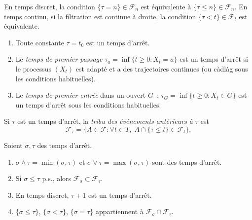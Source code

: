 \begin{remarque}
En temps discret, la condition $\{\tau = n\} \in \mathcal{F}_n$ est \'equivalente
\`a $\{\tau \leq n\} \in \mathcal{F}_n$. En temps continu, si la filtration est
continue \`a droite, la condition $\{\tau < t\} \in \mathcal{F}_t$ est \'equivalente.
\end{remarque}

\begin{exemple}
\begin{enumerate}
  \item Toute constante $\tau = t_0$ est un temps d'arr\^et.
  \item Le \emph{temps de premier passage} $\tau_a = \inf\{t \geq 0 : X_t = a\}$
    est un temps d'arr\^et si le processus $(X_t)$ est adapt\'e et a des trajectoires
    continues (ou c\`adl\`ag sous les conditions habituelles).
  \item Le \emph{temps de premier entr\'ee} dans un ouvert $G$~:
    $\tau_G = \inf\{t \geq 0 : X_t \in G\}$ est un temps d'arr\^et sous les
    conditions habituelles.
\end{enumerate}
\end{exemple}

\begin{definition}
\label{def:tribu_tau}
Si $\tau$ est un temps d'arr\^et, la \emph{tribu des \'ev\'enements ant\'erieurs \`a
$\tau$} est
\[
  \mathcal{F}_{\tau} = \{A \in \mathcal{F} : \forall t \in T,\; A \cap \{\tau \leq t\}
  \in \mathcal{F}_t\}.
\]
\end{definition}

\begin{proposition}
Soient $\sigma, \tau$ des temps d'arr\^et.
\begin{enumerate}
  \item $\sigma \wedge \tau = \min(\sigma, \tau)$ et $\sigma \vee \tau = \max(\sigma, \tau)$
    sont des temps d'arr\^et.
  \item Si $\sigma \leq \tau$ p.s., alors $\mathcal{F}_{\sigma} \subset \mathcal{F}_{\tau}$.
  \item En temps discret, $\tau + 1$ est un temps d'arr\^et.
  \item $\{\sigma \leq \tau\}$, $\{\sigma < \tau\}$, $\{\sigma = \tau\}$ appartiennent
    \`a $\mathcal{F}_{\sigma} \cap \mathcal{F}_{\tau}$.
\end{enumerate}
\end{proposition}

